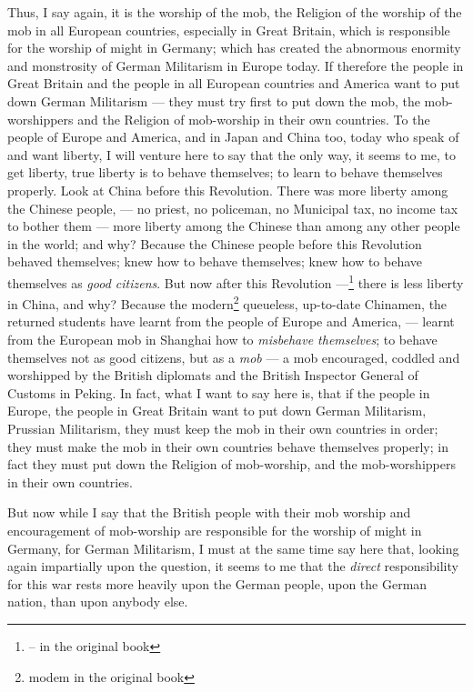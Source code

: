 Thus, I say again, it is the worship of the mob, the Religion of the worship of the mob in all European countries, especially in Great Britain, which is responsible for the worship of might in Germany; which has created the abnormous enormity and monstrosity of German Militarism in Europe today.
If therefore the people in Great Britain and the people in all European countries and America want to put down German Militarism --- they must try first to put down the mob, the mob-worshippers and the Religion of mob-worship in their own countries\cite{num4}. 
To the people of Europe and America, and in Japan and China too, today who speak of and want liberty, I will venture here to say that the only way, it seems to me, to get liberty, true liberty is to behave themselves; to learn to behave themselves properly.
Look at China before this Revolution.
There was more liberty among the Chinese people, --- no priest, no policeman, no Municipal tax, no income tax to bother them --- more liberty among the Chinese than among any other people in the world; and why?
Because the Chinese people before this Revolution behaved themselves; knew how to behave themselves; knew how to behave themselves as \emph{good citizens}.
But now after this Revolution ---\footnote{-- in the original book} there is less liberty in China, and why?
Because the modern\footnote{modem in the original book} queueless, up-to-date Chinamen, the returned students have learnt from the people of Europe and America, --- learnt from the European mob in Shanghai how to \emph{misbehave themselves}; to behave themselves not as good citizens, but as a \emph{mob} --- a mob encouraged, coddled and worshipped by the British diplomats and the British Inspector General of Customs in Peking\cite{num5}. 
In fact, what I want to say here is, that if the people in Europe, the people in Great Britain want to put down German Militarism, Prussian Militarism, they must keep the mob in their own countries in order; they must make the mob in their own countries behave themselves properly; in fact they must put down the Religion of mob-worship, and the mob-worshippers in their own countries.

But now while I say that the British people with their mob worship and encouragement of mob-worship are responsible for the worship of might in Germany, for German Militarism, I must at the same time say here that, looking again impartially upon the question, it seems to me that the \emph{direct} responsibility for this war rests more heavily upon the German people, upon the German nation, than upon anybody else.

